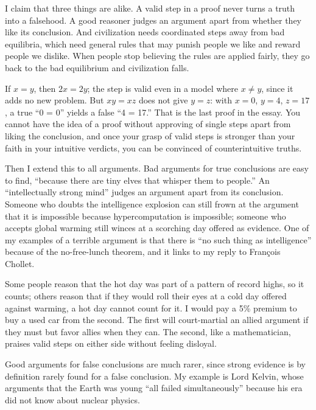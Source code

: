 
I claim that three things are alike. A valid step in a proof never turns a truth into a falsehood. A good reasoner judges an argument apart from whether they like its conclusion. And civilization needs coordinated steps away from bad equilibria, which need general rules that may punish people we like and reward people we dislike. When people stop believing the rules are applied fairly, they go back to the bad equilibrium and civilization falls. 

If $x = y$, then $2x = 2y$; the step is valid even in a model where $x \neq y$, since it adds no new problem. But $xy = xz$ does not give $y = z$: with $x = 0$, $y = 4$, $z = 17$, a true ``0 = 0'' yields a false ``4 = 17.'' That is the last proof in the essay. You cannot have the idea of a proof without approving of single steps apart from liking the conclusion, and once your grasp of valid steps is stronger than your faith in your intuitive verdicts, you can be convinced of counterintuitive truths.

Then I extend this to all arguments. Bad arguments for true conclusions are easy to find, ``because there are tiny elves that whisper them to people.'' An ``intellectually strong mind'' judges an argument apart from its conclusion. Someone who doubts the intelligence explosion can still frown at the argument that it is impossible because hypercomputation is impossible; someone who accepts global warming still winces at a scorching day offered as evidence. One of my examples of a terrible argument is that there is ``no such thing as intelligence'' because of the no-free-lunch theorem, and it links to my reply to François Chollet. 

Some people reason that the hot day was part of a pattern of record highs, so it counts; others reason that if they would roll their eyes at a cold day offered against warming, a hot day cannot count for it. I would pay a 5\% premium to buy a used car from the second. The first will court-martial an allied argument if they must but favor allies when they can. The second, like a mathematician, praises valid steps on either side without feeling disloyal.

Good arguments for false conclusions are much rarer, since strong evidence is by definition rarely found for a false conclusion. My example is Lord Kelvin, whose arguments that the Earth was young ``all failed simultaneously'' because his era did not know about nuclear physics. 

